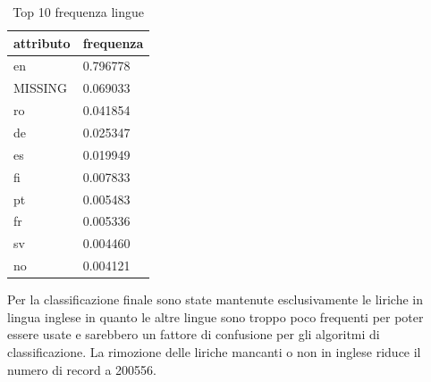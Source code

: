 \documentclass[technote]{IEEEtran}
\begin{document}
\begin{table}[H]
\centering
\caption{Top 10 frequenza lingue}
\begin{tabular}{|l|l|}
\hline
\textbf{attributo} & \textbf{frequenza} \\ \hline
en                 & 0.796778           \\ \hline
MISSING            & 0.069033           \\ \hline
ro                 & 0.041854           \\ \hline
de                 & 0.025347           \\ \hline
es                 & 0.019949           \\ \hline
fi                 & 0.007833           \\ \hline
pt                 & 0.005483           \\ \hline
fr                 & 0.005336           \\ \hline
sv                 & 0.004460           \\ \hline
no                 & 0.004121           \\ \hline
\end{tabular}
\label{t_lang}
\end{table}
Per la classificazione finale sono state mantenute esclusivamente le
liriche in lingua inglese in quanto le altre lingue sono troppo poco frequenti
per poter essere usate e sarebbero un fattore di confusione
per gli algoritmi di classificazione. La rimozione delle liriche mancanti
o non in inglese riduce il numero di record a 200556.
\end{document}
